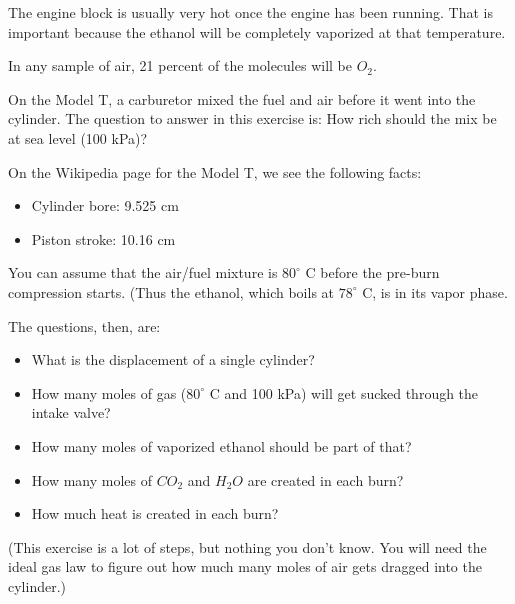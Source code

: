 The engine block is usually very hot once the engine has been running.  That is important because the ethanol will be completely vaporized at that temperature.

In any sample of air,  21 percent of the molecules will be $O_2$.

\begin{Exercise}[title={Fuel Mix for the Model T},  label=fuelmix]

On the Model T, a carburetor mixed the fuel and air before it went into the cylinder.   The question to answer in this exercise is: How rich should the mix be at sea level (100 kPa)?

On the Wikipedia page for the Model T,  we see the following facts:
\begin{itemize}
\item Cylinder bore: 9.525 cm
\item Piston stroke: 10.16 cm
\end{itemize}

You can assume that the air/fuel mixture is $80^\circ$ C before the pre-burn compression starts.  (Thus the ethanol,  which boils at $78^\circ$ C, is in its vapor phase.

The questions, then, are:

\begin{itemize}
\item What is the displacement of a single cylinder?
\item How many moles of gas ($80^\circ$ C and 100 kPa) will get sucked through the intake valve?
\item How many moles of vaporized ethanol should be part of that?
\item How many moles of $CO_2$  and  $H_2O$ are created in each burn?
\item How much heat is created in each burn?
\end{itemize}

(This exercise is a lot of steps, but nothing you don't know.  You will need the ideal gas law to figure out how much many moles of air gets dragged into the cylinder.)

\end{Exercise}

